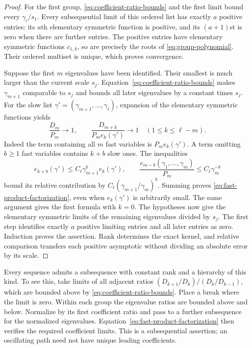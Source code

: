 \begin{proof}
For the first group, \eqref{eq:coefficient-ratio-bounds}
and the first limit bound every $\gamma_i/s_1$.
Every subsequential limit of this ordered list has exactly
$a$ positive entries: its $a$th elementary symmetric
function is positive, and its $(a+1)$st is zero when
there are further entries. The positive entries have
elementary symmetric functions $c_{1,k}$, so are precisely
the roots of \eqref{eq:group-polynomial}. Their ordered
multiset is unique, which proves convergence.

Suppose the first $m$ eigenvalues have been identified.
Their smallest is much larger than the current scale $s_j$.
Equation~\eqref{eq:coefficient-ratio-bounds} makes
$\gamma_{m+1}$ comparable to $s_j$ and bounds all later
eigenvalues by a constant times $s_j$. For the slow list
$\gamma'=(\gamma_{m+1},\ldots,\gamma_\ell)$, expansion of
the elementary symmetric functions yields
\begin{equation}\label{eq:fast-product-factorization}
 \frac{D_m}{P_m}\longrightarrow1,\qquad
 \frac{D_{m+k}}{P_m e_k(\gamma')}\longrightarrow1
                         \quad(1\le k\le\ell-m).
\end{equation}
Indeed the term containing all $m$ fast variables is
$P_me_k(\gamma')$. A term omitting $b\ge1$ fast
variables contains $k+b$ slow ones. The inequalities
\[
 e_{k+b}(\gamma')\le C_\ell\gamma_{m+1}^b e_k(\gamma'),
 \qquad
 \frac{e_{m-b}(\gamma_1,\ldots,\gamma_m)}{P_m}
                                  \le C_\ell\gamma_m^{-b}
\]
bound its relative contribution by
$C_\ell(\gamma_{m+1}/\gamma_m)^b$. Summing proves
\eqref{eq:fast-product-factorization}, even when $e_k(\gamma')$
is arbitrarily small. The same argument gives the first
formula with $k=0$.
The hypotheses now give the elementary symmetric limits
of the remaining eigenvalues divided by $s_j$. The first
step identifies exactly $a$ positive limiting entries and
all later entries as zero. Induction proves the assertion.
Rank determines the exact kernel, and relative comparison
transfers each positive asymptotic without dividing an
absolute error by its scale.
\end{proof}

Every sequence admits a subsequence with constant rank and
a hierarchy of this kind. To see this, take limits of all
adjacent ratios
$(D_{k+1}/D_k)/(D_k/D_{k-1})$, which are bounded above
by \eqref{eq:coefficient-ratio-bounds}. Place a break where
the limit is zero. Within each group the eigenvalue ratios
are bounded above and below. Normalize by its first
coefficient ratio and pass to a further subsequence for
the normalized eigenvalues. Equation~\eqref{eq:fast-product-factorization}
then verifies the required coefficient limits. This is a
subsequential assertion; an oscillating path need not have
unique leading coefficients.

